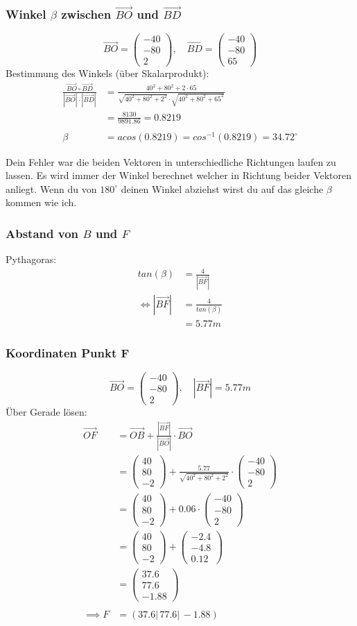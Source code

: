 \documentclass[a4paper,12pt]{article}
\newcommand{\Hinweis}[1]{
	\vspace*{0.3cm}
	\begin{tcolorbox}[breakable,colback=yellow!10,colframe=yellow!65!black,title=\textbf{Hinweis:},width=\linewidth ]
		{#1}
	\end{tcolorbox}
}
\newcommand{\vectr}[3]{\begin{pmatrix}#1\\#2\\#3
\end{pmatrix}}
\begin{document}
	\subsubsection{Winkel $\beta$ zwischen $\vec{BO}$ und $\vec{BD}$}
		\[\vec{BO}= \vectr{-40}{-80}{2},\quad \vec{BD}= \vectr{-40}{-80}{65}\]
		Bestimmung des Winkels (über Skalarprodukt):
		\begin{align*}
			\frac{\vec{BO} \circ \vec{BD} }{|\vec{BO}| \cdot |\vec{BD}|}&= \frac{40^2 + 80^2 + 2\cdot 65}{\sqrt{40^2+80^2+2^2} \cdot \sqrt{40^2+80^2+65^2}}\\
			&= \frac{8130}{9891.86} = 0.8219\\\\
			\beta &= acos(0.8219)= cos^{-1}(0.8219) = 34.72^\circ
		\end{align*}
	\Hinweis{Dein Fehler war die beiden Vektoren in unterschiedliche Richtungen laufen zu lassen. Es wird immer der Winkel berechnet welcher in Richtung beider Vektoren anliegt. Wenn du von $180^\circ$ deinen Winkel abziehst wirst du auf das gleiche $\beta$ kommen wie ich. }
	\subsubsection{Abstand von $B$ und $F$}
		Pythagoras:
		\begin{align*}
			tan(\beta) &= \frac{4}{|\vec{BF}|}\\
			\Leftrightarrow |\vec{BF}|&=\frac{4}{tan(\beta)}\\
			&=5.77 m
		\end{align*}
	\subsubsection{Koordinaten Punkt F}
	\[\vec{BO}= \vectr{-40}{-80}{2},\quad |\vec{BF}|=5.77 m \]
	Über Gerade lösen:
	\begin{align*}
		\vec{OF} &= \vec{OB} + \frac{|\vec{BF}|}{|\vec{BO}|}\cdot \vec{BO}\\
			&=  \vectr{40}{80}{-2} + \frac{5.77}{\sqrt{40^2+80^2+2^2}}\cdot \vectr{-40}{-80}{2}\\
			&= \vectr{40}{80}{-2} + 0.06\cdot \vectr{-40}{-80}{2}\\
			&=\vectr{40}{80}{-2}+\vectr{-2.4}{-4.8}{0.12}\\
			&=\vectr{37.6}{77.6}{-1.88}\\\\
			\implies F&=(37.6|\,77.6|\,-1.88)
	\end{align*}
\newpage
\end{document}
